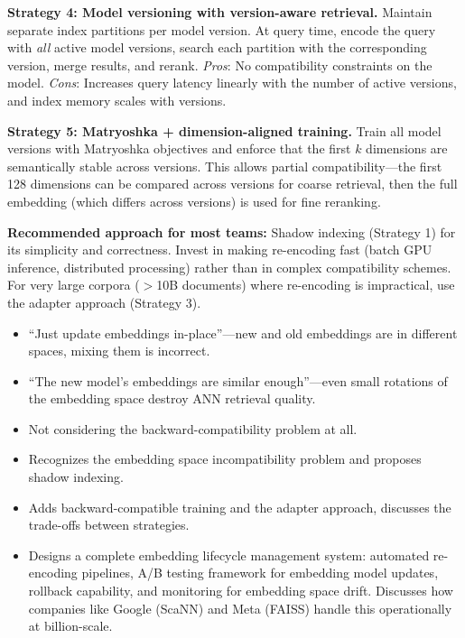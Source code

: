 \begin{interviewq}
\textbf{Strategy 4: Model versioning with version-aware retrieval.} Maintain separate index partitions per model version. At query time, encode the query with \textit{all} active model versions, search each partition with the corresponding version, merge results, and rerank. \textit{Pros}: No compatibility constraints on the model. \textit{Cons}: Increases query latency linearly with the number of active versions, and index memory scales with versions.

\textbf{Strategy 5: Matryoshka + dimension-aligned training.} Train all model versions with Matryoshka objectives and enforce that the first $k$ dimensions are semantically stable across versions. This allows partial compatibility---the first 128 dimensions can be compared across versions for coarse retrieval, then the full embedding (which differs across versions) is used for fine reranking.

\textbf{Recommended approach for most teams:} Shadow indexing (Strategy 1) for its simplicity and correctness. Invest in making re-encoding fast (batch GPU inference, distributed processing) rather than in complex compatibility schemes. For very large corpora ($>$10B documents) where re-encoding is impractical, use the adapter approach (Strategy 3).

\redflags
\begin{itemize}
    \item ``Just update embeddings in-place''---new and old embeddings are in different spaces, mixing them is incorrect.
    \item ``The new model's embeddings are similar enough''---even small rotations of the embedding space destroy ANN retrieval quality.
    \item Not considering the backward-compatibility problem at all.
\end{itemize}


\goodgreat
\begin{itemize}
    \item {} Recognizes the embedding space incompatibility problem and proposes shadow indexing.
    \item {} Adds backward-compatible training and the adapter approach, discusses the trade-offs between strategies.
    \item {} Designs a complete embedding lifecycle management system: automated re-encoding pipelines, A/B testing framework for embedding model updates, rollback capability, and monitoring for embedding space drift. Discusses how companies like Google (ScaNN) and Meta (FAISS) handle this operationally at billion-scale.
\end{itemize}

\end{interviewq}

